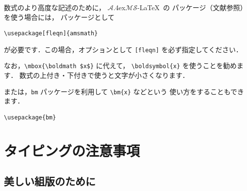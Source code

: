 \documentclass[technicalreport]{ieicej}
\newcommand{\AmSLaTeX}{%
 $\mathcal A$\lower.4ex\hbox{$\!\mathcal M\!$}$\mathcal S$-\LaTeX}
\begin{document}
数式のより高度な記述のために，\AmSLaTeX\ の
パッケージ（文献\cite{FMi1,otobe}参照）を使う場合には，
パッケージとして
\begin{verbatim}
\usepackage[fleqn]{amsmath}
\end{verbatim}
が必要です．この場合，オプションとして
\texttt{[fleqn]} を必ず指定してください．

%

なお，\verb/\mbox{\boldmath $x$}/ に代えて，
\verb/\boldsymbol{x}/ を使うことを勧めます．
数式の上付き・下付きで使うと文字が小さくなります．

または，\texttt{bm} パッケージを利用して \verb/\bm{x}/ などという
使い方をすることもできます．
\begin{verbatim}
\usepackage{bm}
\end{verbatim}

\section{タイピングの注意事項}
\label{sec:typesetting}

\subsection{美しい組版のために}
\label{sec:hyouki}
\end{document}
